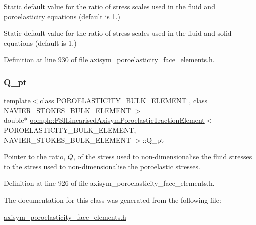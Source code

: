 Static default value for the ratio of stress scales used in the fluid and poroelasticity equations (default is 1.) 

Static default value for the ratio of stress scales used in the fluid and solid equations (default is 1.) 

Definition at line 930 of file axisym\+\_\+poroelasticity\+\_\+face\+\_\+elements.\+h.

\mbox{\label{classoomph_1_1FSILinearisedAxisymPoroelasticTractionElement_a6444d2bd9be7d1e05a8253bd8b848a60}} 
\subsubsection{\texorpdfstring{Q\+\_\+pt}{Q\_pt}}
{\footnotesize\ttfamily template$<$class P\+O\+R\+O\+E\+L\+A\+S\+T\+I\+C\+I\+T\+Y\+\_\+\+B\+U\+L\+K\+\_\+\+E\+L\+E\+M\+E\+NT , class N\+A\+V\+I\+E\+R\+\_\+\+S\+T\+O\+K\+E\+S\+\_\+\+B\+U\+L\+K\+\_\+\+E\+L\+E\+M\+E\+NT $>$ \\
double$\ast$ \hyperlink{classoomph_1_1FSILinearisedAxisymPoroelasticTractionElement}{oomph\+::\+F\+S\+I\+Linearised\+Axisym\+Poroelastic\+Traction\+Element}$<$ P\+O\+R\+O\+E\+L\+A\+S\+T\+I\+C\+I\+T\+Y\+\_\+\+B\+U\+L\+K\+\_\+\+E\+L\+E\+M\+E\+NT, N\+A\+V\+I\+E\+R\+\_\+\+S\+T\+O\+K\+E\+S\+\_\+\+B\+U\+L\+K\+\_\+\+E\+L\+E\+M\+E\+NT $>$\+::Q\+\_\+pt\hspace{0.3cm}{\ttfamily [protected]}}



Pointer to the ratio, $ Q $, of the stress used to non-\/dimensionalise the fluid stresses to the stress used to non-\/dimensionalise the poroelastic stresses. 



Definition at line 926 of file axisym\+\_\+poroelasticity\+\_\+face\+\_\+elements.\+h.



The documentation for this class was generated from the following file\+:\begin{DoxyCompactItemize}
\item 
\hyperlink{axisym__poroelasticity__face__elements_8h}{axisym\+\_\+poroelasticity\+\_\+face\+\_\+elements.\+h}\end{DoxyCompactItemize}
